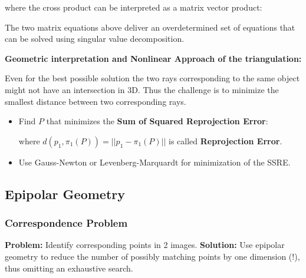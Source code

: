 \documentclass[10pt,a4paper]{scrartcl}
\begin{document}
\begin{multicols*}{2}
where the cross product can be interpreted as a matrix vector product:


The two matrix equations above deliver an overdetermined set of equations that can be solved using singular value decomposition.

\vspace{3ex}

\textbf{Geometric interpretation and Nonlinear Approach of the triangulation:}

\vspace{3ex}

Even for the best possible solution the two rays corresponding to the same object might not have an intersection in 3D. Thus the challenge is to minimize the smallest distance between two corresponding rays.


\begin{itemize}
\item Find $P$ that minimizes the \textbf{Sum of Squared Reprojection Error}:


where $d(p_1,\pi_1(P))=||p_1-\pi_1(P)||$ is called \textbf{Reprojection Error}.
\item Use Gauss-Newton or Levenberg-Marquardt for minimization of the SSRE.
\end{itemize}

\subsection{Epipolar Geometry}

\subsubsection{Correspondence Problem}

\textbf{Problem:} Identify corresponding points in 2 images. \textbf{Solution:} Use epipolar geometry to reduce the number of possibly matching points by one dimension (!), thus omitting an exhaustive search.


\end{multicols*}
\end{document}
